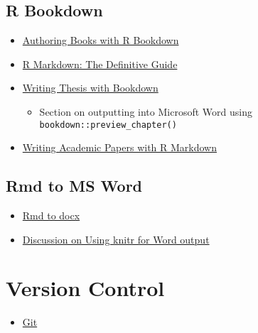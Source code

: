 \documentclass[]{book}
\providecommand{\tightlist}{%
  \setlength{\itemsep}{0pt}\setlength{\parskip}{0pt}}
\begin{document}
\hypertarget{r-bookdown}{%
\section{R Bookdown}\label{r-bookdown}}

\begin{itemize}
\item
  \href{https://bookdown.org/yihui/bookdown/}{Authoring Books with R Bookdown}
\item
  \href{https://bookdown.org/yihui/rmarkdown/}{R Markdown: The Definitive Guide}
\item
  \href{https://eddjberry.netlify.com/post/writing-your-thesis-with-bookdown/}{Writing Thesis with Bookdown}

  \begin{itemize}
  \tightlist
  \item
    Section on outputting into Microsoft Word using \texttt{bookdown::preview\_chapter()}
  \end{itemize}
\item
  \href{https://daijiang.name/en/2017/04/05/writing-academic-papers-with-rmarkdown/}{Writing Academic Papers with R Markdown}
\end{itemize}

\hypertarget{rmd-to-ms-word}{%
\section{Rmd to MS Word}\label{rmd-to-ms-word}}

\begin{itemize}
\item
  \href{https://rmarkdown.rstudio.com/articles_docx.html}{Rmd to docx}
\item
  \href{https://community.rstudio.com/t/nice-tables-when-knitting-to-word/3840}{Discussion on Using knitr for Word output}
\end{itemize}

\hypertarget{version-control}{%
\chapter*{Version Control}\label{version-control}}

\begin{itemize}
\tightlist
\item
  \href{https://git-scm.com/downloads}{Git}
\end{itemize}
\end{document}
